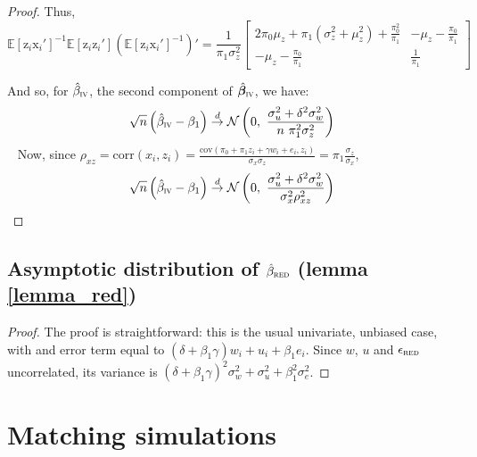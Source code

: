 \documentclass[usletter, 12pt]{article}
\begin{document}
\begin{proof}
		Thus, 
			\[
				     \mathbb{E}[\text{z}_{i}\text{x}_i']^{-1}\mathbb{E}[\text{z}_{i}\text{z}_i']  \left( \mathbb{E}[\text{z}_{i}\text{x}_i']^{-1} \right)' 
				     		= \dfrac{1}{\pi_1 \sigma_{z}^{2}} 
				     			\begin{bmatrix}
								2 \pi_0 \mu_z + \pi_1(\sigma_{z}^{2} + \mu_{z}^{2}) + \frac{\pi_0^2}{\pi_1}&   -\mu_{z} -  \frac{\pi_0}{\pi_1} \\ 
								  -\mu_{z} -  \frac{\pi_0}{\pi_1} & \frac{1}{\pi_1}
							\end{bmatrix} 
			\]
			
			And so, for $\hat{\beta}_{\textsc{iv}}$, the second component of $\hat{\bm{\beta}}_{\textsc{iv}}$, we have:
				\begin{equation}
					\sqrt{n}\left( \hat{\beta}_{\textsc{iv}} - \beta_{1} \right)
					\overset{d}{\to}
					\mathcal{N}\left( 0 , \ \dfrac{\sigma_{u}^{2} + \delta^{2}\sigma_{w}^{2}}{n \ \pi_{1}^{2}\sigma_{z}^{2}} \right) 
				\end{equation}
				~
				Now, since $ \rho_{xz} = \text{corr}(x_{i}, z_{i}) =  \frac{\text{cov}( \pi_0 + \pi_1 z_i + \gamma w_{i} + e_{i} , z_i)}{\sigma_x \sigma_z} = \pi_1 \frac{\sigma_z}{\sigma_x}$,
				~
				\[
						\sqrt{n}\left( \hat{\beta}_{\textsc{iv}} - \beta_{1} \right)
						\overset{d}{\to}
							 \mathcal{N}\left( 0 , \ \dfrac{\sigma_{u}^{2} + \delta^{2}\sigma_{w}^{2}}{\sigma_{x}^{2} \rho_{xz}^{2}} \right) 
				\]
			\end{proof}
				


\subsection{Asymptotic distribution of $\hat{\beta}_{\textsc{red}}$ (lemma \ref{lemma_red})}
				
			\begin{proof}
				The proof is straightforward: this is the usual univariate, unbiased case, with and error term equal to $(\delta + \beta_{1}\gamma) w_{i} + u_{i} + \beta_{1}e_{i}$. Since $w$, $u$ and $\epsilon_{\textsc{red}}$ uncorrelated, its variance is $(\delta + \beta_{1}\gamma)^{2} \sigma_{w}^{2} + \sigma_{u}^{2} + \beta_{1}^{2}\sigma_{e}^{2}$.
			\end{proof}
			
			
			
	
 	\section{Matching simulations}
		
\end{document}
